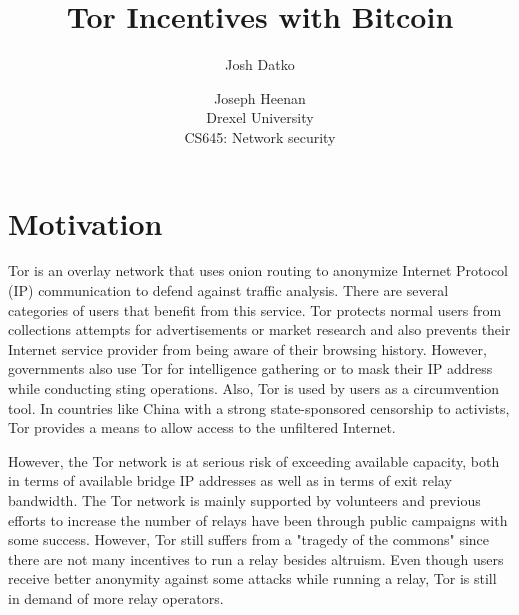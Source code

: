 \documentclass[letterpaper]{article}
\begin{document}
\setcounter{secnumdepth}{1}
\title{Tor Incentives with Bitcoin}
\author{Josh Datko \and Joseph Heenan\\ Drexel University\\
CS645: Network security\\
}
\maketitle

\section{Motivation}\label{sec:motivation}
Tor is an overlay network that uses onion routing to anonymize
Internet Protocol (IP) communication to defend against traffic
analysis.  There are several categories of users that benefit from
this service.  Tor protects normal users from collections attempts for
advertisements or market research and also prevents their Internet
service provider from being aware of their browsing history.  However,
governments also use Tor for intelligence gathering or to mask their
IP address while conducting sting operations.  Also, Tor is used by
users as a circumvention tool\cite{tor-internet-days}.  In countries
like China with a strong state-sponsored censorship to
activists\cite{china-censorship}, Tor provides a means to allow access
to the unfiltered Internet.

However, the Tor network is at serious risk of exceeding available capacity,
both in terms of available bridge IP addresses as well as in terms of
exit relay bandwidth\cite{tor-internet-days}.  The Tor network is
mainly supported by volunteers and previous efforts to increase the
number of relays have been through public
campaigns\cite{eff-campaign} with some success.  However, Tor still
suffers from a "tragedy of the commons\cite{Hardin_1968_Commons}"
since there are not many incentives to run a relay besides altruism.
Even though users receive better anonymity against some attacks while
running a relay\cite{better-anon-tor-relay}, Tor is still in demand of
more relay operators.
\end{document}
